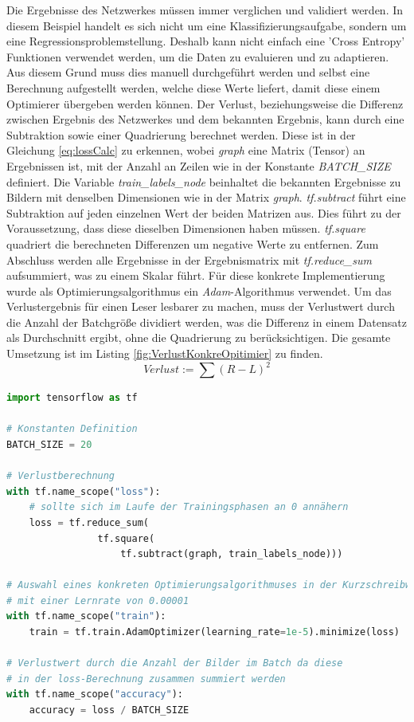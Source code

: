 Die Ergebnisse des Netzwerkes müssen immer verglichen und validiert werden. 
In diesem Beispiel handelt es sich nicht um eine Klassifizierungsaufgabe, sondern um eine Regressionsproblemstellung. 
Deshalb kann nicht einfach eine 'Cross Entropy' Funktionen verwendet werden, um die Daten zu evaluieren und zu adaptieren. 
Aus diesem Grund muss dies manuell durchgeführt werden und selbst eine Berechnung aufgestellt werden, welche diese Werte liefert, damit diese einem Optimierer übergeben werden können. 
Der Verlust, beziehungsweise die Differenz zwischen Ergebnis des Netzwerkes und dem bekannten Ergebnis, kann durch eine Subtraktion sowie einer Quadrierung berechnet werden. 
Diese ist in der Gleichung \ref{eq:lossCalc} zu erkennen, wobei \textit{graph} eine Matrix (Tensor) an Ergebnissen ist, mit der Anzahl an Zeilen wie in der Konstante \textit{BATCH\_SIZE} definiert. 
Die Variable \textit{train\_labels\_node} beinhaltet die bekannten Ergebnisse zu Bildern mit denselben Dimensionen wie in der Matrix \textit{graph}. 
\textit{tf.subtract} führt eine Subtraktion auf jeden einzelnen Wert der beiden Matrizen aus. 
Dies führt zu der Voraussetzung, dass diese dieselben Dimensionen haben müssen. 
\textit{tf.square} quadriert die berechneten Differenzen um negative Werte zu entfernen. 
Zum Abschluss werden alle Ergebnisse in der Ergebnismatrix mit \textit{tf.reduce\_sum} aufsummiert, was zu einem Skalar führt. 
Für diese konkrete Implementierung wurde als Optimierungsalgorithmus ein \textit{Adam}-Algorithmus \cite{DBLP:journals/corr/KingmaB14} verwendet. 
Um das Verlustergebnis für einen Leser lesbarer zu machen, muss der Verlustwert durch die Anzahl der Batchgröße dividiert werden, was die Differenz in einem Datensatz als Durchschnitt ergibt, ohne die Quadrierung zu berücksichtigen. 
Die gesamte Umsetzung ist im Listing \ref{fig:VerlustKonkreOpitimier} zu finden. 
\begin{equation}
	Verlust := \sum{(R - L)^2}
	\label{eq:lossCalc}
\end{equation}
\begin{lstlisting}[caption={Verlustberechnung, konkreter Opitimierungsalgorithmus, Genauigkeitsberechnung},label=fig:VerlustKonkreOpitimier,captionpos=b,language=Python]
import tensorflow as tf

# Konstanten Definition
BATCH_SIZE = 20

# Verlustberechnung
with tf.name_scope("loss"):
    # sollte sich im Laufe der Trainingsphasen an 0 annähern
    loss = tf.reduce_sum(
    			tf.square(
    				tf.subtract(graph, train_labels_node)))

# Auswahl eines konkreten Optimierungsalgorithmuses in der Kurzschreibweise
# mit einer Lernrate von 0.00001
with tf.name_scope("train"):
    train = tf.train.AdamOptimizer(learning_rate=1e-5).minimize(loss)
    
# Verlustwert durch die Anzahl der Bilder im Batch da diese 
# in der loss-Berechnung zusammen summiert werden
with tf.name_scope("accuracy"):    
    accuracy = loss / BATCH_SIZE
\end{lstlisting}
 
